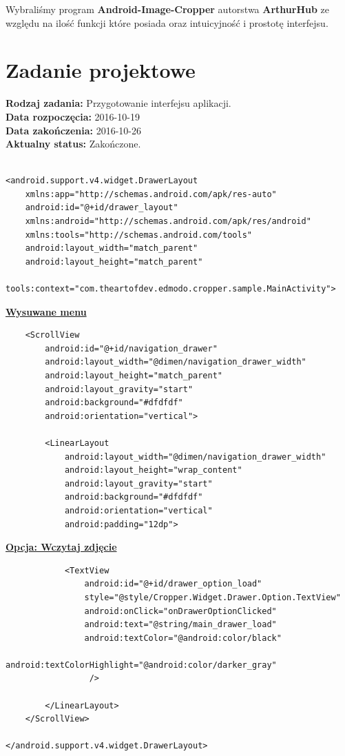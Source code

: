 Wybraliśmy program \textbf{Android-Image-Cropper} autorstwa \textbf{ArthurHub} ze względu na ilość funkcji które posiada oraz intuicyjność i prostotę interfejsu.

\section{Zadanie projektowe}
\noindent\textbf{Rodzaj zadania:}  Przygotowanie interfejsu aplikacji.\\

\noindent\textbf{Data rozpoczęcia:} 2016-10-19\\

\noindent\textbf{Data zakończenia:} 2016-10-26\\

\noindent\textbf{Aktualny status:} Zakończone.\\
\\


\begin{lstlisting}
<android.support.v4.widget.DrawerLayout
    xmlns:app="http://schemas.android.com/apk/res-auto"
    android:id="@+id/drawer_layout"
    xmlns:android="http://schemas.android.com/apk/res/android"
    xmlns:tools="http://schemas.android.com/tools"
    android:layout_width="match_parent"
    android:layout_height="match_parent"
    tools:context="com.theartofdev.edmodo.cropper.sample.MainActivity">
    \end{lstlisting}
    \centering\underline{\textbf{Wysuwane menu}}
    \begin{lstlisting}
    <ScrollView
        android:id="@+id/navigation_drawer"
        android:layout_width="@dimen/navigation_drawer_width"
        android:layout_height="match_parent"
        android:layout_gravity="start"
        android:background="#dfdfdf"
        android:orientation="vertical">

        <LinearLayout
            android:layout_width="@dimen/navigation_drawer_width"
            android:layout_height="wrap_content"
            android:layout_gravity="start"
            android:background="#dfdfdf"
            android:orientation="vertical"
            android:padding="12dp">
\end{lstlisting}
\centering\underline{\textbf{Opcja: Wczytaj zdjęcie}}
\begin{lstlisting}
            <TextView
                android:id="@+id/drawer_option_load"
                style="@style/Cropper.Widget.Drawer.Option.TextView"
                android:onClick="onDrawerOptionClicked"
                android:text="@string/main_drawer_load"
                android:textColor="@android:color/black"
                android:textColorHighlight="@android:color/darker_gray"
                 />

        </LinearLayout>
    </ScrollView>

</android.support.v4.widget.DrawerLayout>

\end{lstlisting}



